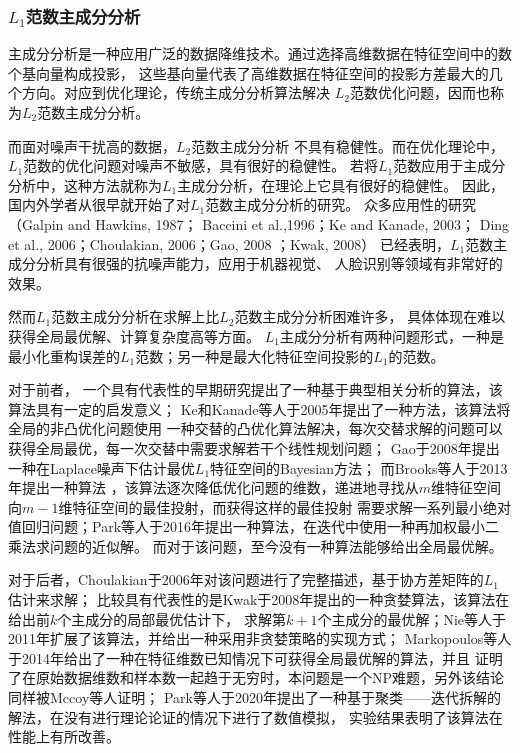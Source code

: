 \subsubsection{$L_1$范数主成分分析}
主成分分析是一种应用广泛的数据降维技术。通过选择高维数据在特征空间中的数个基向量构成投影，
这些基向量代表了高维数据在特征空间的投影方差最大的几个方向。对应到优化理论，传统主成分分析算法解决
$L_2$范数优化问题，因而也称为$L_2$范数主成分分析。

而面对噪声干扰高的数据，$L_2$范数主成分分析
不具有稳健性。而在优化理论中，$L_1$范数的优化问题对噪声不敏感，具有很好的稳健性。
若将$L_1$范数应用于主成分分析中，这种方法就称为$L_1$主成分分析，在理论上它具有很好的稳健性。
因此，国内外学者从很早就开始了对$L_1$范数主成分分析的研究。
众多应用性的研究（Galpin and Hawkins, 1987\cite{galpin1987methods}；
Baccini et al.,1996\cite{baccini1996l1}；Ke and Kanade, 2003\cite{ke2003robust}；
Ding et al., 2006\cite{ding2006r}；Choulakian, 2006\cite{choulakian2006l1}；Gao, 2008\cite{gao2008robust}
；Kwak, 2008\cite{kwak2008principal}）
已经表明，$L_1$范数主成分分析具有很强的抗噪声能力，应用于机器视觉\cite{ke2005robust}、
人脸识别\cite{kwak2008principal}等领域有非常好的效果。

然而$L_1$范数主成分分析在求解上比$L_2$范数主成分分析困难许多，
具体体现在难以获得全局最优解、计算复杂度高等方面。
$L_1$主成分分析有两种问题形式，一种是最小化重构误差的$L_1$范数；另一种是最大化特征空间投影的$L_1$的范数。

对于前者，
一个具有代表性的早期研究\cite{baccini1996l1}提出了一种基于典型相关分析的算法，该算法具有一定的启发意义；
Ke和Kanade等人于2005年提出了一种方法\cite{ke2005robust}，该算法将全局的非凸优化问题使用
一种交替的凸优化算法解决，每次交替求解的问题可以获得全局最优，每一次交替中需要求解若干个线性规划问题；
Gao于2008年提出一种在Laplace噪声下估计最优$L_1$特征空间的Bayesian方法\cite{gao2008robust}；
而Brooks等人于2013年提出一种算法
\cite{brooks2013pure}，该算法逐次降低优化问题的维数，递进地寻找从$m$维特征空间向$m-1$维特征空间的最佳投射，而获得这样的最佳投射
需要求解一系列最小绝对值回归问题；Park等人于2016年提出一种算法\cite{park2016iteratively}，在迭代中使用一种再加权最小二乘法求问题的近似解。
而对于该问题，至今没有一种算法能够给出全局最优解。

对于后者，Choulakian于2006年对该问题进行了完整描述\cite{choulakian2006l1}，基于协方差矩阵的$L_1$估计\cite{galpin1987methods}来求解；
比较具有代表性的是Kwak于2008年提出的一种贪婪算法\cite{kwak2008principal}，该算法在给出前$k$个主成分的局部最优估计下，
求解第$k+1$个主成分的最优解；Nie等人于2011年扩展了该算法，并给出一种采用非贪婪策略的实现方式\cite{nie2011robust}；
Markopoulos等人于2014年给出了一种在特征维数已知情况下可获得全局最优解的算法\cite{markopoulos2014optimal}，并且
证明了在原始数据维数和样本数一起趋于无穷时，本问题是一个NP难题，另外该结论同样被Mccoy\cite{mccoy2010two}等人证明；
Park等人于2020年提出了一种基于聚类——迭代拆解的解法\cite{park2021optimization}，在没有进行理论论证的情况下进行了数值模拟，
实验结果表明了该算法在性能上有所改善。

